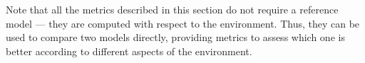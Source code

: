 \documentclass{article}
\theoremstyle{definition}
\theoremstyle{remark}
\newcommand{\realm}{{\ensuremath{M^*}}\xspace}
\newif\ifaddcomments
\newcommand{\roni}[1]{\ifaddcomments{\textcolor{red}{[Roni: #1]}}\fi}
\newcommand{\gregor}[1]{\ifaddcomments{\textcolor{orange}{[Gregor: #1]}}\fi}
\newcommand{\cm}[1]{\ifaddcomments{\textcolor{olive}{[Christian: #1]}}\fi}
\begin{document}
Note that all the metrics described in this section do not require a reference model --- they are computed with respect to the environment. Thus, they can be used to compare two models directly,  providing metrics to assess which one is better according to different aspects of the environment.





\end{document}
